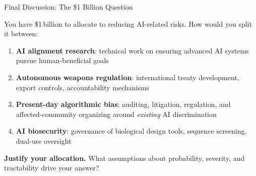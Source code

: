 \documentclass[aspectratio=169,11pt]{beamer}
\begin{document}
\begin{frame}[shrink=11]{Final Discussion: The \$1 Billion Question}
\begin{discussionbox}
You have \$1\,billion to allocate to reducing AI-related risks. How would you split it between:

\vspace{0.1cm}
\begin{enumerate}
    \item[(A)] \textbf{AI alignment research}: technical work on ensuring advanced AI systems pursue human-beneficial goals
    \item[(B)] \textbf{Autonomous weapons regulation}: international treaty development, export controls, accountability mechanisms
    \item[(C)] \textbf{Present-day algorithmic bias}: auditing, litigation, regulation, and affected-community organizing around \emph{existing} AI discrimination
    \item[(D)] \textbf{AI biosecurity}: governance of biological design tools, sequence screening, dual-use oversight
\end{enumerate}

\vspace{0.1cm}
\textbf{Justify your allocation.} What assumptions about probability, severity, and tractability drive your answer?
\end{discussionbox}
\end{frame}
\end{document}
